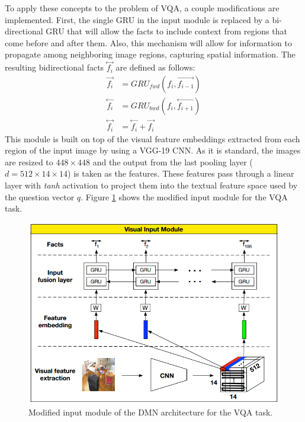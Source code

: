 \documentclass{article}
\begin{document}
To apply these concepts to the problem of VQA, a couple modifications are implemented. First, the single GRU in the input module is replaced by a bi-directional GRU that will allow the facts to include context from regions that come before and after them. Also, this mechanism will allow for information to propagate among neighboring image regions, capturing spatial information. The resulting bidirectional facts $\overset{\longleftrightarrow}{f_i}$ are defined as follows:
\begin{align*}
    \overset{\longrightarrow}{f_i} &= GRU_{fwd}(f_i, \overset{\longrightarrow}{f_{i-1}})\\
    \overset{\longleftarrow}{f_i} &= GRU_{bwd}(f_i, \overset{\longleftarrow}{f_{i+1}})\\
    \overset{\longleftrightarrow}{f_i} &= \overset{\longleftarrow}{f_i} + \overset{\longrightarrow}{f_i}
\end{align*}
This module is built on top of the visual feature embeddings extracted from each region of the input image by using a VGG-19 CNN. As it is standard, the images are resized to $448 \times 448$ and the output from the last pooling layer ($d = 512 \times 14 \times 14$) is taken as the features. These features pass through a linear layer with \emph{tanh} activation to project them into the textual feature space used by the question vector $q$. Figure \ref{dmnInput} shows the modified input module for the VQA task.

    \begin{figure}[ht]
    	\centering
            \includegraphics[width=0.75\linewidth]{dmnInput.PNG}
    	\caption{Modified input module of the DMN architecture for the VQA task.}
    	\label{dmnInput}
    \end{figure}
\end{document}
